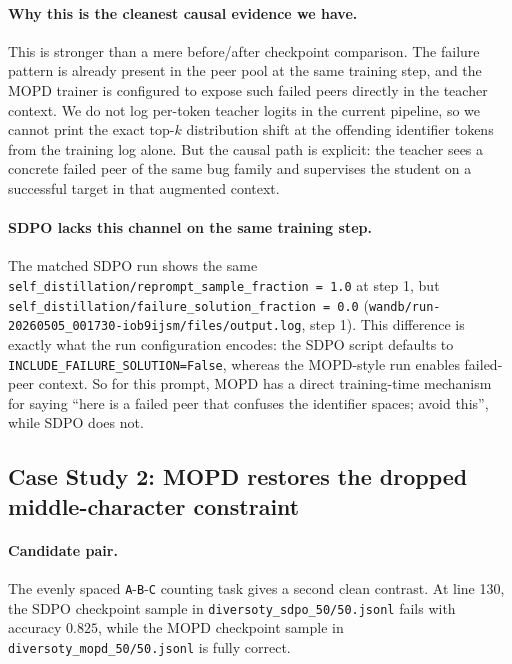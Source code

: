 \paragraph{Why this is the cleanest causal evidence we have.}
This is stronger than a mere before/after checkpoint comparison.
The failure pattern is already present in the peer pool at the same training
step, and the MOPD trainer is configured to expose such failed peers directly
in the teacher context.
We do not log per-token teacher logits in the current pipeline, so we cannot
print the exact top-$k$ distribution shift at the offending identifier tokens
from the training log alone.
But the causal path is explicit:
the teacher sees a concrete failed peer of the same bug family and supervises
the student on a successful target in that augmented context.

\paragraph{SDPO lacks this channel on the same training step.}
The matched SDPO run shows the same
\texttt{self\_distillation/reprompt\_sample\_fraction = 1.0} at step 1, but
\texttt{self\_distillation/failure\_solution\_fraction = 0.0}
(\texttt{wandb/run-20260505\_001730-iob9ijsm/files/output.log}, step 1).
This difference is exactly what the run configuration encodes:
the SDPO script defaults to
\texttt{INCLUDE\_FAILURE\_SOLUTION=False}, whereas the MOPD-style run enables
failed-peer context.
So for this prompt, MOPD has a direct training-time mechanism for saying
``here is a failed peer that confuses the identifier spaces; avoid this'',
while SDPO does not.

\subsection{Case Study 2: MOPD restores the dropped middle-character constraint}

\paragraph{Candidate pair.}
The evenly spaced \texttt{A}-\texttt{B}-\texttt{C} counting task gives a second
clean contrast.
At line 130, the SDPO checkpoint sample in
\texttt{diversoty\_sdpo\_50/50.jsonl} fails with accuracy $0.825$,
while the MOPD checkpoint sample in
\texttt{diversoty\_mopd\_50/50.jsonl} is fully correct.

